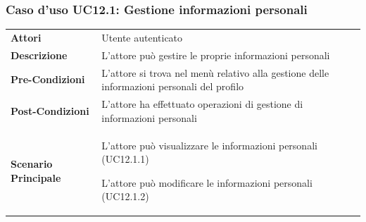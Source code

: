 \subsubsection{Caso d'uso UC12.1: Gestione informazioni personali}
\label{UC12_1}

\begin{minipage}{\linewidth}
	\begin{tabular}{ l | p{11cm}}
		\hline
		\rowcolor{Gray}
		\multicolumn{2}{c}{UC12.1 - Gestione informazioni personali} \\
		\hline
		\textbf{Attori} & Utente autenticato \\
		\textbf{Descrizione} & L'attore può gestire le proprie informazioni personali\\
		\textbf{Pre-Condizioni} & L'attore si trova nel menù relativo alla gestione delle informazioni personali del profilo\\
		\textbf{Post-Condizioni} & L'attore ha effettuato operazioni di gestione di informazioni personali \\
		\textbf{Scenario Principale} & 
		\begin{enumerate*}[label=(\arabic*.),itemjoin={\newline}]
			\item L'attore può visualizzare le informazioni personali (UC12.1.1)
			\item L'attore può modificare le informazioni personali (UC12.1.2)
		\end{enumerate*}
	\end{tabular}
\end{minipage}

